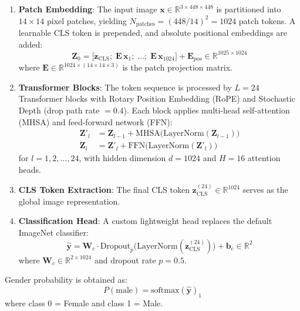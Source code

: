 \documentclass[11pt,a4paper]{article}
\newcommand{\R}{\mathbb{R}}
\newcommand{\softmax}{\mathrm{softmax}}
\newcommand{\layernorm}{\mathrm{LayerNorm}}
\newcommand{\cls}{\mathrm{CLS}}
\begin{document}
\begin{enumerate}[nosep]
    \item \textbf{Patch Embedding}: The input image $\mathbf{x} \in \R^{3 \times 448 \times 448}$ is partitioned into $14 \times 14$ pixel patches, yielding $N_{\text{patches}} = (448/14)^2 = 1024$ patch tokens. A learnable CLS token is prepended, and absolute positional embeddings are added:
    \begin{equation}
    \mathbf{Z}_0 = \bigl[\mathbf{z}_{\cls};\; \mathbf{E}\,\mathbf{x}_1;\; \ldots;\; \mathbf{E}\,\mathbf{x}_{1024}\bigr] + \mathbf{E}_{\text{pos}} \in \R^{1025 \times 1024}
    \end{equation}
    where $\mathbf{E} \in \R^{1024 \times (14 \times 14 \times 3)}$ is the patch projection matrix.
    
    \item \textbf{Transformer Blocks}: The token sequence is processed by $L = 24$ Transformer blocks with Rotary Position Embedding (RoPE) and Stochastic Depth (drop path rate $= 0.4$). Each block applies multi-head self-attention (MHSA) and feed-forward network (FFN):
    \begin{align}
    \mathbf{Z}'_l &= \mathbf{Z}_{l-1} + \text{MHSA}\bigl(\layernorm(\mathbf{Z}_{l-1})\bigr) \\
    \mathbf{Z}_l &= \mathbf{Z}'_l + \text{FFN}\bigl(\layernorm(\mathbf{Z}'_l)\bigr)
    \end{align}
    for $l = 1, 2, \ldots, 24$, with hidden dimension $d = 1024$ and $H = 16$ attention heads.
    
    \item \textbf{CLS Token Extraction}: The final CLS token $\mathbf{z}_{\cls}^{(24)} \in \R^{1024}$ serves as the global image representation.
    
    \item \textbf{Classification Head}: A custom lightweight head replaces the default ImageNet classifier:
    \begin{equation}
    \hat{\mathbf{y}} = \mathbf{W}_c \cdot \text{Dropout}_{p}\bigl(\layernorm(\mathbf{z}_{\cls}^{(24)})\bigr) + \mathbf{b}_c \in \R^2
    \label{eq:gender_head}
    \end{equation}
    where $\mathbf{W}_c \in \R^{2 \times 1024}$ and dropout rate $p = 0.5$.
\end{enumerate}

Gender probability is obtained as:
\begin{equation}
P(\text{male}) = \softmax(\hat{\mathbf{y}})_1
\end{equation}
where class 0 = Female and class 1 = Male.
\end{document}
